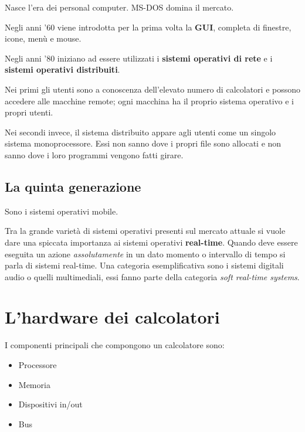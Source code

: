 Nasce l'era dei personal computer. MS-DOS domina il mercato.

Negli anni '60 viene introdotta per la prima volta la \textbf{GUI}, completa di finestre, icone, menù e mouse.

Negli anni '80 iniziano ad essere utilizzati i \textbf{sistemi operativi di rete} e i \textbf{sistemi operativi distribuiti}.

Nei primi gli utenti sono a conoscenza dell'elevato numero di calcolatori e possono accedere alle macchine remote; ogni macchina ha il proprio sistema operativo e i propri utenti.

Nei secondi invece, il sistema distribuito appare agli utenti come un singolo sistema monoprocessore. Essi non sanno dove i propri file sono allocati e non sanno dove i loro programmi vengono fatti girare.

\subsection{La quinta generazione}
Sono i sistemi operativi mobile.

Tra la grande varietà di sistemi operativi presenti sul mercato attuale si vuole dare una spiccata importanza ai sistemi operativi \textbf{real-time}.
Quando deve essere eseguita un azione \textit{assolutamente} in un dato momento o intervallo di tempo si parla di sistemi real-time.
Una categoria esemplificativa sono i sistemi digitali audio o quelli multimediali, essi fanno parte della categoria \textit{soft real-time systems}.


\paragraph*{}
\paragraph*{}
\section{L'hardware dei calcolatori}
I componenti principali che compongono un calcolatore sono:
\begin{itemize}
    \item Processore
    \item Memoria
    \item Dispositivi in/out
    \item Bus
\end{itemize}

